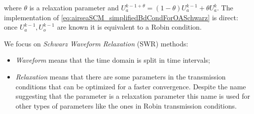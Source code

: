 where $\theta$ is a relaxation parameter and
$U_a^{k-1+\theta} = (1-\theta) U_a^{k-1} + \theta U_a^{k}$.
The implementation of
\eqref{eq:airseaSCM_simplifiedBdCondForOASchwarz} is direct:
once $U_a^{k-1}, U_o^{k-1}$ are known it is equivalent to a Robin
condition.
\par
We focus on \textit{Schwarz Waveform Relaxation} (SWR) methods:
\begin{itemize}
	\item \textit{Waveform} means that the time domain
		is split in time intervals;
	\item \textit{Relaxation} means that there
		are some parameters in the transmission conditions
		that can be optimized for a faster convergence.
		Despite the name suggesting that the parameter is a
		relaxation parameter this name is used for
		other types of parameters like the ones in
		Robin transmission conditions.
\end{itemize}

